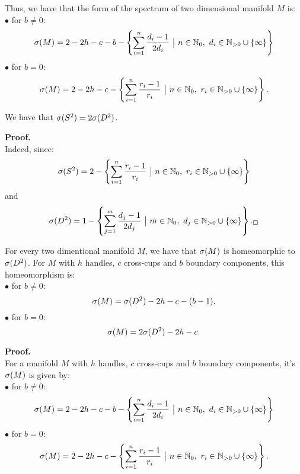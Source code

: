 Thus, we have that the form of the spectrum of two dimensional manifold $M$ is:\\
$\bullet$ for $b\neq 0$: 
\begin{equation}
\spe(M) = 2-2h-c-b - \left\{\sum\limits_{i=1}^n\frac{d_i-1}{2d_i}\ 
\big|\ n\in\mathbb{N}_0,\ d_i\in\mathbb{N}_{>0}\cup \{\infty\}\right\}
\end{equation}
$\bullet$ for $b = 0$:
\begin{equation}
\spe(M) = 2-2h-c - \left\{\sum\limits_{i=1}^n \frac{r_i-1}{r_i}\ \big|\ n\in\mathbb{N}_0,\ 
r_i\in\mathbb{N}_{>0}\cup \{\infty\}\right\}.
\end{equation} 
\label{two dim manifold spectrum}


\begin{observation}\label{2times homeomorphism}
We have that ${{\sigma}(S^2)} = 2{{\sigma}(D^2)}$.
\end{observation}
\textbf{Proof.}\\

Indeed, since: 
\begin{align}
\spe(S^2) = 2 -\left\{\sum\limits_{i=1}^n \frac{r_i-1}{r_i}\ \big|\ n\in\mathbb{N}_0,\ 
r_i\in\mathbb{N}_{>0}\cup \{\infty\}\right\}
\end{align}
and 
\begin{align}
\spe(D^2) = 1 - \left\{\sum\limits_{j=1}^m\frac{d_j-1}{2d_j}\ 
\big|\ m\in\mathbb{N}_0,\ d_j\in\mathbb{N}_{>0}\cup \{\infty\}\right\}._\square
\end{align}

\begin{observation}\label{all_spectra_are_isomorphic}\label{spe_M}
For every two dimentional manifold $M$, we have that ${\sigma}(M)$ is homeomorphic to ${{\sigma}(D^2)}$. 
For $M$ with $h$ handles, $c$ cross-cups and $b$ boundary components, this homeomorphism is: \\
$\bullet$ for $b \neq 0$:
\begin{equation}
{\sigma}(M) = {{\sigma}(D^2)} - 2h - c - (b - 1), 
\end{equation}
$\bullet$ for $b = 0$:
\begin{equation}
{\sigma}(M) = 2{{\sigma}(D^2)} - 2h - c.
\end{equation}  
\end{observation}

\textbf{Proof.} \\
For a manifold $M$ with $h$ handles, $c$ cross-cups and $b$ boundary components, it's 
${{\sigma}(M)}$ is given by:\\
$\bullet$ for $b\neq 0$: 
\begin{equation}
\spe(M) = 2-2h-c-b - \left\{\sum\limits_{i=1}^n\frac{d_i-1}{2d_i}\ 
\big|\ n\in\mathbb{N}_0,\ d_i\in\mathbb{N}_{>0}\cup \{\infty\}\right\}
\end{equation}
$\bullet$ for $b = 0$:
\begin{equation}
\spe(M) = 2-2h-c - \left\{\sum\limits_{i=1}^n \frac{r_i-1}{r_i}\ \big|\ n\in\mathbb{N}_0,\ 
r_i\in\mathbb{N}_{>0}\cup \{\infty\}\right\}.
\end{equation} 

